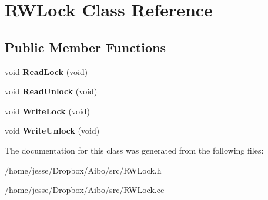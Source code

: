 \hypertarget{classRWLock}{
\section{RWLock Class Reference}
\label{classRWLock}
}
\subsection*{Public Member Functions}
\begin{DoxyCompactItemize}
\item 
\hypertarget{classRWLock_a227a76c65bcde4a01b488f29802ec2c4}{
void {\bfseries ReadLock} (void)}
\label{classRWLock_a227a76c65bcde4a01b488f29802ec2c4}

\item 
\hypertarget{classRWLock_ad5262a2b23281d6234ecc8436bfbf774}{
void {\bfseries ReadUnlock} (void)}
\label{classRWLock_ad5262a2b23281d6234ecc8436bfbf774}

\item 
\hypertarget{classRWLock_a2d7f9c0f234567845ae8c99b0791d797}{
void {\bfseries WriteLock} (void)}
\label{classRWLock_a2d7f9c0f234567845ae8c99b0791d797}

\item 
\hypertarget{classRWLock_a0379424e5e9a582de74f4918a7106d34}{
void {\bfseries WriteUnlock} (void)}
\label{classRWLock_a0379424e5e9a582de74f4918a7106d34}

\end{DoxyCompactItemize}


The documentation for this class was generated from the following files:\begin{DoxyCompactItemize}
\item 
/home/jesse/Dropbox/Aibo/src/RWLock.h\item 
/home/jesse/Dropbox/Aibo/src/RWLock.cc\end{DoxyCompactItemize}
